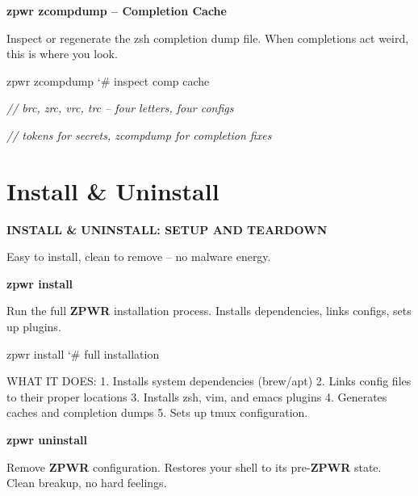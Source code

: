 \documentclass[11pt,a4paper,twoside]{book}
\begin{document}
\vspace{12pt}
{\bfseries\color{neonyellow} zpwr zcompdump  -- Completion Cache}\vspace{4pt}

Inspect or regenerate the zsh completion dump file. When completions act weird, this is where you look.

\begin{codebox}
\color{neongreen}zpwr zcompdump              {\char`\#} inspect comp cache\\
\end{codebox}

{\small\itshape\color{dimtext} // brc, zrc, vrc, trc -- four letters, four configs}

{\small\itshape\color{dimtext} // tokens for secrets, zcompdump for completion fixes}


\vspace{16pt}

\section{Install \& Uninstall}


\vspace{10pt}
{\large\bfseries\color{neoncyan} INSTALL \& UNINSTALL: SETUP AND TEARDOWN}\vspace{6pt}

Easy to install, clean to remove -- no malware energy.


\vspace{12pt}
{\bfseries\color{neonyellow} zpwr install}\vspace{4pt}

Run the full \textbf{ZPWR} installation process. Installs dependencies, links configs, sets up plugins.

\begin{codebox}
\color{neongreen}zpwr install                {\char`\#} full installation\\
\end{codebox}

WHAT IT DOES: 1. Installs system dependencies (brew/apt) 2. Links config files to their proper locations 3. Installs zsh, vim, and emacs plugins 4. Generates caches and completion dumps 5. Sets up tmux configuration.


\vspace{12pt}
{\bfseries\color{neonyellow} zpwr uninstall}\vspace{4pt}

Remove \textbf{ZPWR} configuration. Restores your shell to its pre-\textbf{ZPWR} state. Clean breakup, no hard feelings.
\end{document}
